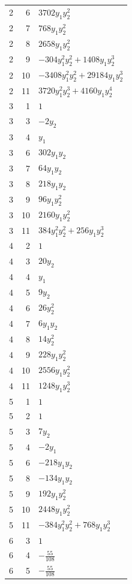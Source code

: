 \documentclass[10pt,a4paper]{article}
\begin{document}
{\begin{longtable}{rrp{125mm}}
2 & 6 & $3702 y_{1} y_{2}^{2}$\\
2 & 7 & $768 y_{1} y_{2}^{2}$\\
2 & 8 & $2658 y_{1} y_{2}^{2}$\\
2 & 9 & $- 304 y_{1}^{2} y_{2}^{2} + 1408 y_{1} y_{2}^{3}$\\
2 & 10 & $- 3408 y_{1}^{2} y_{2}^{2} + 29184 y_{1} y_{2}^{3}$\\
2 & 11 & $3720 y_{1}^{2} y_{2}^{3} + 4160 y_{1} y_{2}^{4}$\\
3 & 1 & $1$\\
3 & 3 & $- 2 y_{2}$\\
3 & 4 & $y_{1}$\\
3 & 6 & $302 y_{1} y_{2}$\\
3 & 7 & $64 y_{1} y_{2}$\\
3 & 8 & $218 y_{1} y_{2}$\\
3 & 9 & $96 y_{1} y_{2}^{2}$\\
3 & 10 & $2160 y_{1} y_{2}^{2}$\\
3 & 11 & $384 y_{1}^{2} y_{2}^{2} + 256 y_{1} y_{2}^{3}$\\
4 & 2 & $1$\\
4 & 3 & $20 y_{2}$\\
4 & 4 & $y_{1}$\\
4 & 5 & $9 y_{2}$\\
4 & 6 & $26 y_{2}^{2}$\\
4 & 7 & $6 y_{1} y_{2}$\\
4 & 8 & $14 y_{2}^{2}$\\
4 & 9 & $228 y_{1} y_{2}^{2}$\\
4 & 10 & $2556 y_{1} y_{2}^{2}$\\
4 & 11 & $1248 y_{1} y_{2}^{3}$\\
5 & 1 & $1$\\
5 & 2 & $1$\\
5 & 3 & $7 y_{2}$\\
5 & 4 & $- 2 y_{1}$\\
5 & 6 & $- 218 y_{1} y_{2}$\\
5 & 8 & $- 134 y_{1} y_{2}$\\
5 & 9 & $192 y_{1} y_{2}^{2}$\\
5 & 10 & $2448 y_{1} y_{2}^{2}$\\
5 & 11 & $- 384 y_{1}^{2} y_{2}^{2} + 768 y_{1} y_{2}^{3}$\\
6 & 3 & $1$\\
6 & 4 & $- \frac{55}{108}$\\
6 & 5 & $- \frac{55}{108}$\\

\end{longtable}}
\end{document}
